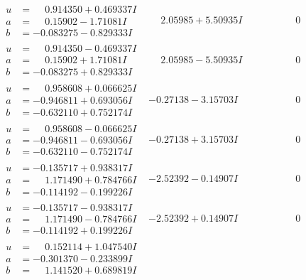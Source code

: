 \documentclass[1p]{elsarticle_modified}
\theoremstyle{definition}
\begin{document}
$$\begin{array}{c|c|c}
 \hline 
\begin{aligned}
u &= \phantom{-}0.914350 + 0.469337 I \\
a &= \phantom{-}0.15902 - 1.71081 I \\
b &= -0.083275 - 0.829333 I\end{aligned}
 & \phantom{-}2.05985 + 5.50935 I & \phantom{-0.000000 } 0 \\ \hline\begin{aligned}
u &= \phantom{-}0.914350 - 0.469337 I \\
a &= \phantom{-}0.15902 + 1.71081 I \\
b &= -0.083275 + 0.829333 I\end{aligned}
 & \phantom{-}2.05985 - 5.50935 I & \phantom{-0.000000 } 0 \\ \hline\begin{aligned}
u &= \phantom{-}0.958608 + 0.066625 I \\
a &= -0.946811 + 0.693056 I \\
b &= -0.632110 + 0.752174 I\end{aligned}
 & -0.27138 - 3.15703 I & \phantom{-0.000000 } 0 \\ \hline\begin{aligned}
u &= \phantom{-}0.958608 - 0.066625 I \\
a &= -0.946811 - 0.693056 I \\
b &= -0.632110 - 0.752174 I\end{aligned}
 & -0.27138 + 3.15703 I & \phantom{-0.000000 } 0 \\ \hline\begin{aligned}
u &= -0.135717 + 0.938317 I \\
a &= \phantom{-}1.171490 + 0.784766 I \\
b &= -0.114192 - 0.199226 I\end{aligned}
 & -2.52392 - 0.14907 I & \phantom{-0.000000 } 0 \\ \hline\begin{aligned}
u &= -0.135717 - 0.938317 I \\
a &= \phantom{-}1.171490 - 0.784766 I \\
b &= -0.114192 + 0.199226 I\end{aligned}
 & -2.52392 + 0.14907 I & \phantom{-0.000000 } 0 \\ \hline\begin{aligned}
u &= \phantom{-}0.152114 + 1.047540 I \\
a &= -0.301370 - 0.233899 I \\
b &= \phantom{-}1.141520 + 0.689819 I\end{aligned}

\end{array}$$
\end{document}
